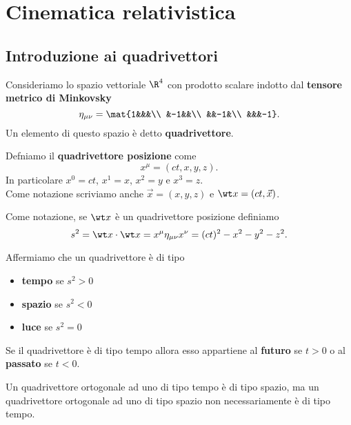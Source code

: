 \chapter{Cinematica relativistica}

\section{Introduzione ai quadrivettori}
\begin{definition}[Quadrivettore]
Consideriamo lo spazio vettoriale $\R^4$ con prodotto scalare indotto dal \textbf{tensore metrico di Minkovsky}
\[\eta_{\mu\nu}=\mat{1&&&\\
&-1&&\\
&&-1&\\
&&&-1}.\]
Un elemento di questo spazio \`e detto \textbf{quadrivettore}.
\end{definition}

\begin{definition}
Defniamo il \textbf{quadrivettore posizione} come
\[x^\mu=(ct,x,y,z).\]
In particolare $x^0=ct$, $x^1=x$, $x^2=y$ e $x^3=z$.\\
Come notazione scriviamo anche $\vec x=(x,y,z)$ e $\wt x=(ct,\vec x)$.
\end{definition}

\begin{notation}
Come notazione, se $\wt x$ \`e un quadrivettore posizione definiamo
\[s^2=\wt x\cdot \wt x=x^\mu\eta_{\mu\nu}x^\nu=(ct)^2-x^2-y^2-z^2.\]
\end{notation}

\begin{definition}
Affermiamo che un quadrivettore \`e di tipo 
\begin{itemize}
\item \textbf{tempo} se $s^2>0$
\item \textbf{spazio} se $s^2<0$
\item \textbf{luce} se $s^2=0$
\end{itemize}
Se il quadrivettore \`e di tipo tempo allora esso appartiene al \textbf{futuro} se $t>0$ o al \textbf{passato} se $t<0$.
\end{definition}

\begin{remark}
Un quadrivettore ortogonale ad uno di tipo tempo \`e di tipo spazio, ma un quadrivettore ortogonale ad uno di tipo spazio non necessariamente \`e di tipo tempo.
\end{remark}

